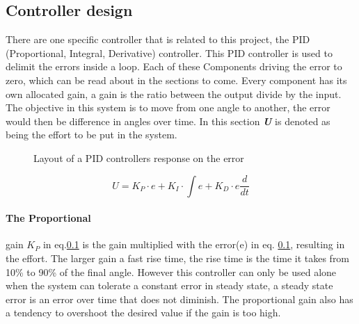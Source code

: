 \subsection{Controller design} \label{PID}
There are one specific controller that is related to this project, the PID (Proportional, Integral, Derivative) controller. This PID controller is used to delimit the errors inside a loop. Each of these Components driving the error to zero, which can be read about in the sections to come. Every component has its own allocated gain, a gain is the ratio between the output divide by the input. The objective in this system is to move from one angle to another, the error would then be difference in angles over time. In this section \textbf{\textit{U}} is denoted as being the effort to be put in the system.\\

\begin{figure}
    \centering
    
    \caption{Layout of a PID controllers response on the error}
    \label{fig:mPID}
\end{figure}


\begin{equation}\label{PID}
    U=K_P\cdot\textit{e}+K_I\cdot\int\textit{e}+K_D\cdot\textit{e}\frac{d}{dt}
\end{equation}

\paragraph{The Proportional} gain $K_P$ in eq.\ref{PID} is the gain multiplied with the error(e) in eq. \ref{PID}, resulting in the effort. The larger gain a fast rise time, the rise time is the time it takes from 10\% to 90\% of the final angle. However this controller can only be used alone when the system can tolerate a constant error in steady state, a steady state error is an error over time that does not diminish. The proportional gain also has a tendency to overshoot the desired value if the gain is too high\cite{Control1DK}.\\


